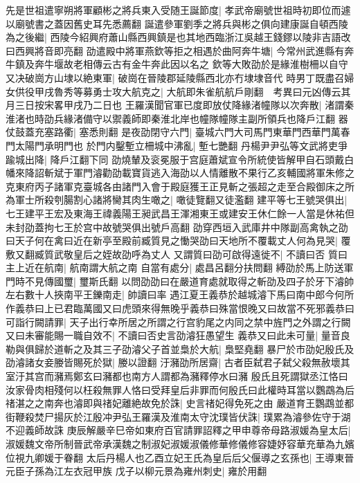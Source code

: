 先是世祖遣寧朔將軍顧彬之將兵東入受随王誕節度|{
	孝武帝廟號世祖時初即位而遽以廟號書之蓋因舊史耳先悉薦翻}
誕遣參軍劉季之將兵與彬之俱向建康誕自頓西陵為之後繼|{
	西陵今紹興府蕭山縣西興鎮是也其地西臨浙江吳越王錢鏐以陵非吉語改曰西興將音即亮翻}
劭遣殿中將軍燕欽等拒之相遇於曲阿奔牛塘|{
	今常州武進縣有奔牛鎮及奔牛堰故老相傳云古有金牛奔此因以名之}
欽等大敗劭於是緣淮樹柵以自守又决破崗方山埭以絶東軍|{
	破崗在晉陵郡延陵縣西北亦冇埭埭音代}
時男丁既盡召婦女供役甲戌魯秀等募勇士攻大航克之|{
	大航即朱雀航航戶剛翻　考異曰元凶傳云其月三日按宋畧甲戌乃二日也}
王羅漢聞官軍已度即放仗降緣渚幢隊以次奔散|{
	渚謂秦淮渚也時劭兵緣渚備守以禦義師即秦淮北岸也幢隊幢隊主副所領兵也降戶江翻}
器仗鼓蓋充塞路衢|{
	塞悉則翻}
是夜劭閉守六門|{
	臺城六門大司馬門東華門西華門萬春門太陽門承明門也}
於門内鑿塹立柵城中沸亂|{
	塹七艷翻}
丹楊尹尹弘等文武將吏爭踰城出降|{
	降戶江翻下同}
劭燒輦及衮冕服于宫庭蕭斌宣令所統使皆解甲自石頭戴白幡來降詔斬斌于軍門濬勸劭載寶貨逃入海劭以人情離散不果行乙亥輔國將軍朱修之克東府丙子諸軍克臺城各由諸門入會于殿庭獲王正見斬之張超之走至合殿御床之所為軍士所殺刳腸割心諸將臠其肉生噉之|{
	噉徒覽翻又徒濫翻}
建平等七王號哭俱出|{
	七王建平王宏及東海王禕義陽王昶武昌王渾湘東王或建安王休仁餘一人當是休祐但未封劭蓋拘七王於宫中故號哭俱出號戶高翻}
劭穿西垣入武庫井中隊副高禽執之劭曰天子何在禽曰近在新亭至殿前臧質見之慟哭劭曰天地所不覆載丈人何為見哭|{
	覆敷又翻臧質武敬皇后之姪故劭呼為丈人}
又謂質曰劭可啟得遠徙不|{
	不讀曰否}
質曰主上近在航南|{
	航南謂大航之南}
自當有處分|{
	處昌呂翻分扶問翻}
縛劭於馬上防送軍門時不見傳國璽|{
	璽斯氏翻}
以問劭劭曰在嚴道育處就取得之斬劭及四子於牙下濬帥左右數十人挾南平王鑠南走|{
	帥讀曰率}
遇江夏王義恭於越城濬下馬曰南中郎今何所作義恭曰上已君臨萬國又曰虎頭來得無晚乎義恭曰殊當恨晚又曰故當不死邪義恭曰可詣行闕請罪|{
	天子出行幸所居之所謂之行宫豹尾之内同之禁中旌門之外謂之行闕}
又曰未審能賜一職自效不|{
	不讀曰否史言劭濬狂愚望生}
義恭又曰此未可量|{
	量音良}
勒與俱歸於道斬之及其三子劭濬父子首並梟於大航|{
	梟堅堯翻}
暴尸於市劭妃殷氏及劭濬諸女妾媵皆賜死於獄|{
	媵以證翻}
汙瀦劭所居齋|{
	古者臣弑君子弑父殺無赦壞其室汙其宫而瀦焉鄭玄曰瀦都也南方人謂都為瀦釋停水曰瀦}
殷氏且死謂獄丞江恪曰汝家骨肉相殘何以枉殺無罪人恪曰受拜皇后非罪而何殷氏曰此權時耳當以鸚鵡為后禇湛之之南奔也濬即與禇妃離絶故免於誅|{
	史言禇妃得免死之由}
嚴道育王鸚鵡並都街鞭殺焚尸揚灰於江殷冲尹弘王羅漢及淮南太守沈璞皆伏誅|{
	璞累為濬參佐守于湖不迎義師故誅}
庚辰解嚴辛巳帝如東府百官請罪詔釋之甲申尊帝母路淑媛為皇太后|{
	淑媛魏文帝所制晉武帝承漢魏之制淑妃淑媛淑儀修華修儀修容婕妤容華充華為九嬪位視九卿媛于眷翻}
太后丹楊人也乙酉立妃王氏為皇后后父偃導之玄孫也|{
	王導東晉元臣子孫為江左衣冠甲族}
戊子以柳元景為雍州刺史|{
	雍於用翻}
